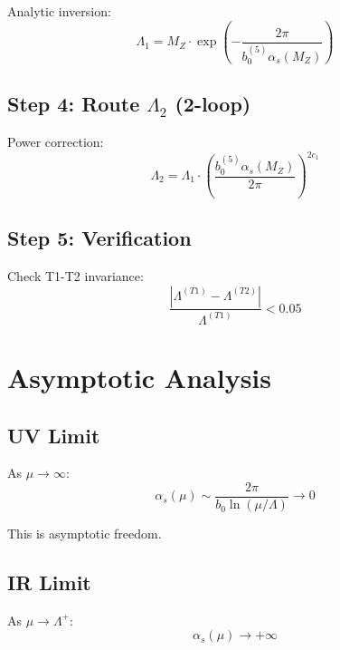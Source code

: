 \documentclass[11pt,a4paper]{article}
\theoremstyle{definition}
\begin{document}
Analytic inversion:
\begin{equation}
\label{eq:app-74}
\Lambda_1 = M_Z \cdot \exp\left(-\frac{2\pi}{b_0^{(5)}\alpha_s(M_Z)}\right)
\end{equation}

\subsection{Step 4: Route $\Lambda_2$ (2-loop)}
\label{subsec:app-step4}

Power correction:
\begin{equation}
\label{eq:app-75}
\Lambda_2 = \Lambda_1 \cdot \left(\frac{b_0^{(5)}\alpha_s(M_Z)}{2\pi}\right)^{2c_1}
\end{equation}

\subsection{Step 5: Verification}
\label{subsec:app-step5}

Check T1-T2 invariance:
\begin{equation}
\label{eq:app-76}
\frac{|\Lambda^{(T1)} - \Lambda^{(T2)}|}{\Lambda^{(T1)}} < 0.05
\end{equation}

\section{Asymptotic Analysis}
\label{app:asymptotic}

\subsection{UV Limit}
\label{subsec:app-uv}

As $\mu \to \infty$:
\begin{equation}
\label{eq:app-77}
\alpha_s(\mu) \sim \frac{2\pi}{b_0\ln(\mu/\Lambda)} \to 0
\end{equation}

This is asymptotic freedom.

\subsection{IR Limit}
\label{subsec:app-ir}

As $\mu \to \Lambda^+$:
\begin{equation}
\label{eq:app-78}
\alpha_s(\mu) \to +\infty
\end{equation}
\end{document}
